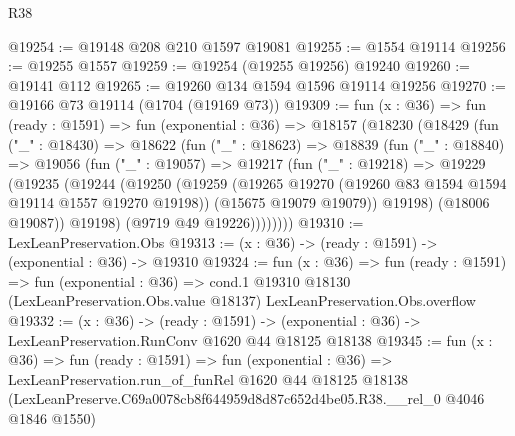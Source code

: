 \begin{lexlean}{R38}
\begin{coremodule}
@19254 := @19148 @208 @210 @1597 @19081
@19255 := @1554 @19114
@19256 := @19255 @1557
@19259 := @19254 (@19255 @19256) @19240
@19260 := @19141 @112
@19265 := @19260 @134 @1594 @1596 @19114 @19256
@19270 := @19166 @73 @19114 (@1704 (@19169 @73))
@19309 := fun (x : @36) =>
  fun (ready : @1591) =>
  fun (exponential : @36) =>
  @18157
    (@18230
      (@18429
        (fun ("_" : @18430) =>
        @18622
          (fun ("_" : @18623) =>
          @18839
            (fun ("_" : @18840) =>
            @19056
              (fun ("_" : @19057) =>
              @19217
                (fun ("_" : @19218) =>
                @19229
                  (@19235
                    (@19244
                      (@19250
                        (@19259
                          (@19265 @19270 (@19260 @83 @1594 @1594 @19114 @1557 @19270 @19198))
                          (@15675 @19079 @19079))
                        @19198)
                      (@18006 @19087))
                    @19198)
                  (@9719 @49 @19226))))))))
@19310 := LexLeanPreservation.Obs
@19313 := (x : @36) -> (ready : @1591) -> (exponential : @36) -> @19310
@19324 := fun (x : @36) =>
  fun (ready : @1591) =>
  fun (exponential : @36) =>
  cond.{1} @19310 @18130 (LexLeanPreservation.Obs.value @18137) LexLeanPreservation.Obs.overflow
@19332 := (x : @36) ->
  (ready : @1591) -> (exponential : @36) -> LexLeanPreservation.RunConv @1620 @44 @18125 @18138
@19345 := fun (x : @36) =>
  fun (ready : @1591) =>
  fun (exponential : @36) =>
  LexLeanPreservation.run_of_funRel
    @1620
    @44
    @18125
    @18138
    (LexLeanPreserve.C69a0078cb8f644959d8d87c652d4be05.R38.__rel_0 @4046 @1846 @1550)
\end{coremodule}
\end{lexlean}
